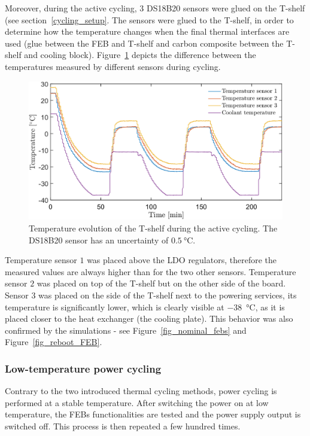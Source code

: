 Moreover, during the active cycling, $3$ DS18B20 sensors were glued on the T-shelf (see section~\ref{cycling_setup}. The sensors were glued to the T-shelf, in order to determine how the temperature changes when the final thermal interfaces are used (glue between the FEB and T-shelf and carbon composite between the T-shelf and cooling block). Figure~\ref{fig_active_sensors} depicts the difference between the temperatures measured by different sensors during cycling. 

\begin{figure}[!h]
\centering
\includegraphics[width=0.75\columnwidth]{Chapter4/images/active.png}
\caption{Temperature evolution of the T-shelf during the active cycling. The DS18B20 \cite{DS18B20} sensor has an uncertainty of $\SI{0.5}{\celsius}$.}
\label{fig_active_sensors}
\end{figure}

\newpage
Temperature sensor $1$ was placed above the \gls{LDO} regulators, therefore the measured values are always higher than for the two other sensors. Temperature sensor $2$ was placed on top of the T-shelf but on the other side of the board. Sensor $3$ was placed on the side of the T-shelf next to the powering services, its temperature is significantly lower, which is clearly visible at \SI{-38}{\celsius}, as it is placed closer to the heat exchanger (the cooling plate). This behavior was also confirmed by the simulations - see Figure~\ref{fig_nominal_febs} and Figure~\ref{fig_reboot_FEB}. 



\subsubsection{Low-temperature power cycling}
Contrary to the two introduced thermal cycling methods, power cycling is performed at a stable temperature. After switching the power on at low temperature, the \glspl{FEB} functionalities are tested and the power supply output is switched off. This process is then repeated a few hundred times. 

